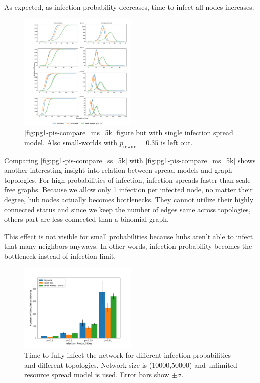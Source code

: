 \documentclass[conference]{IEEEtran}
\begin{document}
As expected, as infection probability decreases, time to infect all nodes increases.

\begin{figure}[htb]
  \begin{center}
	\includegraphics[width=0.5\textwidth]{img/pg1-pis-compare_ss_5k.pdf}
  \end{center}
	\caption{\autoref{fig:pg1-pis-compare_ms_5k} figure but with single infection spread model. Also small-worlds with $p_{\text{rewire}}=0.35$ is left out.}
	\label{fig:pg1-pis-compare_ss_5k}
\end{figure}

Comparing \autoref{fig:pg1-pis-compare_ss_5k} with \autoref{fig:pg1-pis-compare_ms_5k} shows another interesting insight into relation between spread models and graph topologies. For high probabilities of infection, infection spreads faster than scale-free graphs. Because we allow only 1 infection per infected node, no matter their degree, hub nodes actually becomes bottlenecks. They cannot utilize their highly connected status and since we keep the number of edges same across topologies, others part are less connected than a binomial graph.

This effect is not visible for small probabilities because hubs aren't able to infect that many neighbors anyways. In other words, infection probability becomes the bottleneck instead of infection limit.

\begin{figure}[htb]
  \begin{center}
	\includegraphics[width=0.5\textwidth]{img/pg1-pis-compare_ms_10k_bar.pdf}
  \end{center}
	\caption{Time to fully infect the network for different infection probabilities and different topologies. Network size is (10000,50000) and unlimited resource spread model is used. Error bars show $\pm \sigma$.}
	\label{fig:pg1-pis-compare_ms_10k_bar}
\end{figure}
\end{document}
